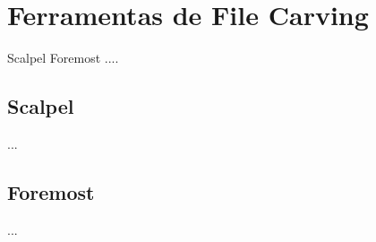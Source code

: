\chapter{Ferramentas de File Carving}
Scalpel
Foremost
....

\section{Scalpel}
...

\section{Foremost}
...